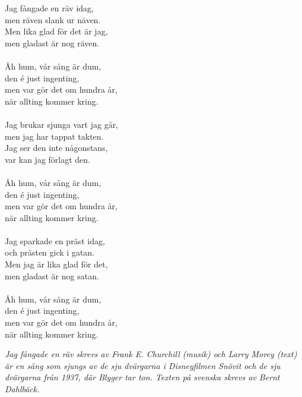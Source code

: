 \vspace{10pt}
Jag fångade en räv idag,\\
men räven slank ur näven.\\
Men lika glad för det är jag,\\
men gladast är nog räven.\\
\\
Åh hum, vår sång är dum,\\
den é just ingenting,\\
men var gör det om hundra år,\\
när allting kommer kring.\\
\\
Jag brukar sjunga vart jag går,\\
men jag har tappat takten.\\
Jag ser den inte någonstans,\\
var kan jag förlagt den.\\
\\
Åh hum, vår sång är dum,\\
den é just ingenting,\\
men var gör det om hundra år,\\
när allting kommer kring.\\
\\
Jag sparkade en präst idag,\\
och prästen gick i gatan.\\
Men jag är lika glad för det,\\
men gladast är nog satan.\\
\\
Åh hum, vår sång är dum,\\
den é just ingenting,\\
men var gör det om hundra år,\\
när allting kommer kring.
\par
\vspace{10pt}
{\footnotesize\textit{Jag fångade en räv skrevs av Frank E. Churchill (musik) och Larry Morey (text) är en sång som sjungs av de sju dvärgarna i Disneyfilmen Snövit och de sju dvärgarna från 1937, där Blyger tar ton. Texten på svenska skrevs av Bernt Dahlbäck.}}
